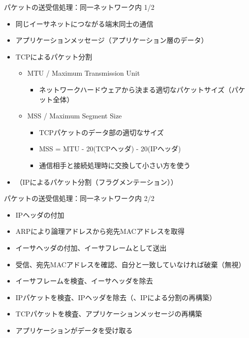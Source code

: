 \documentclass[12pt,aspectratio=169]{beamer}
\begin{document}
\begin{frame}{パケットの送受信処理：同一ネットワーク内 1/2}

  \begin{itemize}
    \item 同じイーサネットにつながる端末同士の通信
    \vspace{0.5cm}
    \item アプリケーションメッセージ（アプリケーション層のデータ）
    \item TCPによるパケット分割
      \begin{itemize}
        \item MTU / Maximum Transmission Unit
          \begin{itemize}
            \item ネットワークハードウェアから決まる適切なパケットサイズ（パケット全体）
          \end{itemize}
        \item MSS / Maximum Segment Size
          \begin{itemize}
            \item TCPパケットのデータ部の適切なサイズ
            \item MSS = MTU - 20(TCPヘッダ) - 20(IPヘッダ)
            \item 通信相手と接続処理時に交換して小さい方を使う
          \end{itemize}
      \end{itemize}
    \item （IPによるパケット分割（フラグメンテーション））
  \end{itemize}

\end{frame}

\begin{frame}{パケットの送受信処理：同一ネットワーク内 2/2}

  \begin{itemize}
    \item IPヘッダの付加
    \item ARPにより論理アドレスから宛先MACアドレスを取得
    \item イーサヘッダの付加、イーサフレームとして送出
    \vspace{0.5cm}
    \item 受信、宛先MACアドレスを確認、自分と一致していなければ破棄（無視）
    \item イーサフレームを検査、イーサヘッダを除去
    \item IPパケットを検査、IPヘッダを除去（、IPによる分割の再構築）
    \item TCPパケットを検査、アプリケーションメッセージの再構築
    \item アプリケーションがデータを受け取る
  \end{itemize}

\end{frame}
\end{document}
